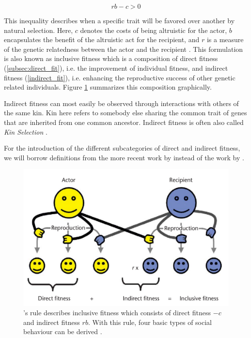 \documentclass[sigconf]{acmart}
\begin{document}
    \begin{equation}
        rb-c>0\label{eq:rb-c}
    \end{equation}


    This inequality describes when a specific trait will be favored over another by natural selection.
    Here, $c$ denotes the costs of being altruistic for the actor, $b$ encapsulates the benefit of the altruistic act for the recipient, and $r$ is a measure of the genetic relatedness between the actor and the recipient \cite{west_altruism_2010}.
    This formulation is also known as inclusive fitness which is a composition of direct fitness (\ref{subsec:direct_fit}), i.e. the improvement of individual fitness, and indirect fitness (\ref{indirect_fit}), i.e. enhancing the reproductive success of other genetic related individuals.
    Figure \ref{fig:hamilton} summarizes this composition graphically.

    Indirect fitness can most easily be observed through interactions with others of the same kin.
    Kin here refers to somebody else sharing the common trait of genes that are inherited from one common ancestor.
    Indirect fitness is often also called \textit{Kin Selection} \cite{west_altruism_2010}.

    For the introduction of the different subcategories of direct and indirect fitness, we will borrow definitions from the more recent work by \citeauthor{west_altruism_2010} \cite{west_altruism_2010} instead of the work by \citeauthor{gardner_theory_2009} \cite{gardner_theory_2009}.

    \begin{figure}
        \includegraphics[width=\columnwidth]{figures/hamiltons_rule}
        \caption{\citeauthor{hamilton_kin_1964}'s rule describes inclusive fitness which consists of direct fitness $-c$ and indirect fitness $rb$. With this rule, four basic types of social behaviour can be derived \cite{gardner_theory_2009}.}
        \label{fig:hamilton}
    \end{figure}
\end{document}
